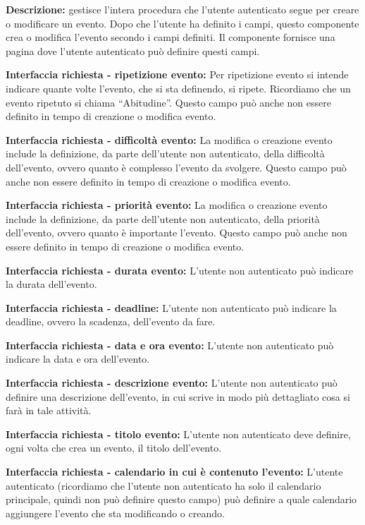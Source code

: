 \begin{listaPersonale}[DCI]{}

    \textbf{Descrizione:} gestisce l'intera procedura che l'utente autenticato segue per creare o modificare un evento. Dopo che l'utente ha definito i campi, questo componente crea o modifica l'evento secondo i campi definiti.  Il componente fornisce una pagina dove l'utente autenticato può definire questi campi.

    \textbf{Interfaccia richiesta - ripetizione evento:} Per ripetizione evento si intende indicare quante volte l'evento, che si sta definendo, si ripete. Ricordiamo che un evento ripetuto si chiama “Abitudine”. Questo campo può anche non essere definito in tempo di creazione o modifica evento.

    \textbf{Interfaccia richiesta - difficoltà evento:} La modifica o creazione evento include la definizione, da parte dell'utente non autenticato, della difficoltà dell'evento, ovvero quanto è complesso l'evento da svolgere. Questo campo può anche non essere definito in tempo di creazione o modifica evento.

    \textbf{Interfaccia richiesta - priorità evento:} La modifica o creazione evento include la definizione, da parte dell'utente non autenticato, della priorità dell'evento, ovvero quanto è importante l'evento. Questo campo può anche non essere definito in tempo di creazione o modifica evento.

    \textbf{Interfaccia richiesta - durata evento:} L'utente non autenticato può indicare la durata dell'evento.

    \textbf{Interfaccia richiesta - deadline:} L'utente non autenticato può indicare la deadline, ovvero la scadenza, dell'evento da fare.

    \textbf{Interfaccia richiesta - data e ora evento:} L'utente non autenticato può indicare la data e ora dell'evento.

    \textbf{Interfaccia richiesta - descrizione evento:} L'utente non autenticato può definire una descrizione dell'evento, in cui scrive in modo più dettagliato cosa si farà in tale attività.

    \textbf{Interfaccia richiesta - titolo evento:} L'utente non autenticato deve definire, ogni volta che crea un evento, il titolo dell'evento.

    \textbf{Interfaccia richiesta - calendario in cui è contenuto l'evento:} L'utente autenticato (ricordiamo che l'utente non autenticato ha solo il calendario principale, quindi non può definire questo campo) può definire a quale calendario aggiungere l'evento che sta modificando o creando.


\end{listaPersonale}
